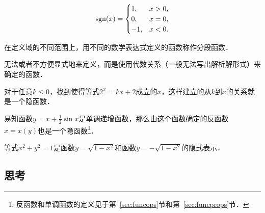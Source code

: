 \begin{definition*}[正负号函数\footnote{通行的译名为“符号函数”，有歧义，不从．另参见\url{https://www.termonline.cn/wordDetail?subject=f58bc05926ad11ee9fd4b068e6519520&base=1}}]
  \[
    \operatorname{sgn}(x) =
    \begin{cases}
      1, & x > 0, \\
      0, & x = 0, \\
      -1, & x < 0.
    \end{cases}
  \]
\end{definition*}

\begin{definition*}[分段函数]
  在定义域的不同范围上，用不同的数学表达式定义的函数称作分段函数．
\end{definition*}

\begin{definition*}[隐函数]
  无法或者不方便显式地来定义，而是使用代数关系（一般无法写出解析解形式）来确定的函数．
\end{definition*}

\begin{example*}
  对于任意\(k \le 0\)，找到使得等式\(2^x = kx + 2\)成立的\(x\)，这样建立的从\(k\)到\(x\)的关系就是一个隐函数．
\end{example*}

\begin{example*}
  易知函数\(y = x + \frac12 \sin x\)是单调递增函数，那么由这个函数确定的反函数\(x = x(y)\)也是一个隐函数\footnote{反函数和单调函数的定义见于第~\ref{sec:funcops}节和第~\ref{sec:funcprops}节．}．
\end{example*}

\begin{example*}
  等式\(x^2 + y^2 = 1\)是函数\(y = \sqrt{1 - x^2}\)和函数\(y = -\sqrt{1 - x^2}\)的隐式表示．
\end{example*}

\subsection*{思考}

